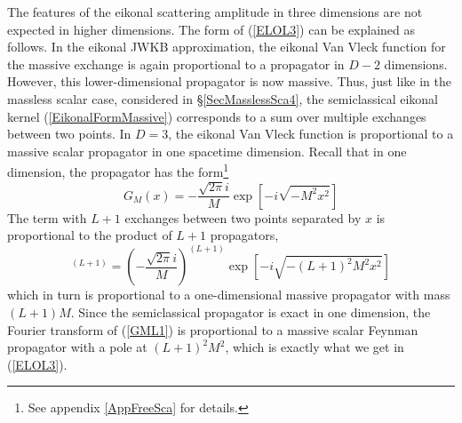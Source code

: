 The features of the eikonal scattering amplitude in three dimensions are not expected in higher dimensions. The form of (\ref{ELOL3}) can be explained as follows. In the eikonal JWKB approximation, the eikonal Van Vleck function for the massive exchange is again proportional to a propagator in $D - 2$ dimensions. However, this lower-dimensional propagator is now massive. Thus, just like in the massless scalar case, considered in \S\ref{SecMasslessSca4}, the semiclassical eikonal kernel (\ref{EikonalFormMassive}) corresponds to a sum over multiple exchanges between two points. In $D = 3$, the eikonal Van Vleck function is proportional to a massive scalar propagator in one spacetime dimension. Recall that in one dimension, the propagator has the form\footnote{See appendix \ref{AppFreeSca} for details.}
\begin{equation}
	G_{M}(x) = - \frac{\sqrt{2 \pi} i}{M} \exp{\left[ - i \sqrt{- M^{2} x^{2}} \right]}
\end{equation}
The term with $L + 1$ exchanges between two points separated by $x$ is proportional to the product of $L+1$ propagators,
\begin{equation}
	[G_{M}(x)]^{(L+1)} = \left( - \frac{\sqrt{2 \pi} i}{M} \right)^{(L+1)} \exp{\left[ - i \sqrt{- (L+1)^{2}M^{2} x^{2}} \right]} \label{GML1}
\end{equation}
which in turn is proportional to a one-dimensional massive propagator with mass $(L+1)M$. Since the semiclassical propagator is exact in one dimension, the Fourier transform of (\ref{GML1}) is proportional to a massive scalar Feynman propagator with a pole at $(L+1)^{2} M^{2}$, which is exactly what we get in (\ref{ELOL3}).
